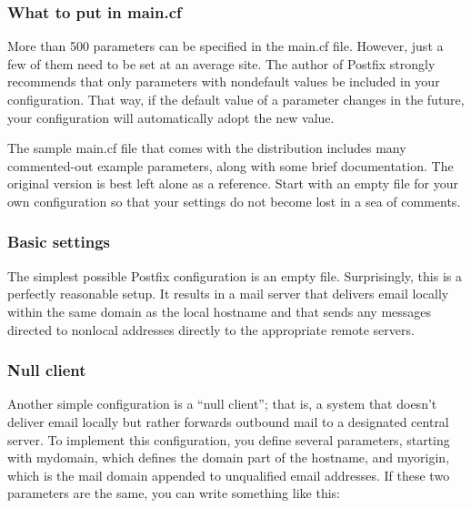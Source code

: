 \subsubsection[What to put in
{main.cf}]{\texorpdfstring{\protect\hypertarget{part0026_split_061.htmlux5cux23_idTextAnchor1173}{}{}What
to put in {main.cf}}{What to put in main.cf}}

More than 500 parameters can be specified in the {main.cf} file.
However, just a few of them need to be set at an average site. The
author of Postfix strongly recommends that only parameters with
nondefault values be included in your configuration. That way, if the
default value of a parameter changes in the future, your configuration
will automatically adopt the new value.

The sample {main.cf} file that comes with the distribution includes many
{commented}-out example parameters, along with some brief documentation.
The original version is best left alone as a reference. Start with an
empty file for your own configuration so that your settings do not
become lost in a sea of comments.

\subsubsection[Basic
settings]{\texorpdfstring{\protect\hypertarget{part0026_split_061.htmlux5cux23_idTextAnchor1174}{}{}Basic
settings}{Basic settings}}

The simplest possible Postfix configuration is an empty file.
Surprisingly, this is a perfectly reasonable setup. It results in a mail
server that delivers email locally within the same domain as the local
hostname and that sends any messages directed to nonlocal addresses
directly to the appropriate remote servers.

\subsubsection[Null
client]{\texorpdfstring{\protect\hypertarget{part0026_split_061.htmlux5cux23_idTextAnchor1175}{}{}Null
client}{Null client}}

\protect\hypertarget{part0026_split_061.htmlux5cux23_idIndexMarker2710}{}{}Another
simple configuration is a ``null client''; that is, a system that
doesn't deliver email locally but rather forwards outbound mail to a
designated central server. To implement this configuration, you define
several parameters, starting with {mydomain}, which defines the domain
part of the hostname, and {myorigin}, which is the mail domain appended
to unqualified email addresses. If these two parameters are the same,
you can write something like this:

